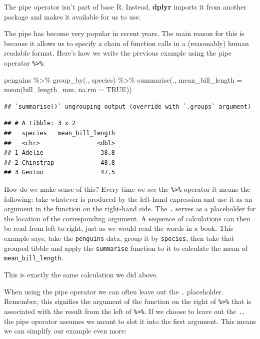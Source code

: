 \documentclass[
]{book}
\newenvironment{Shaded}{\begin{snugshade}}{\end{snugshade}}
\newcommand{\AttributeTok}[1]{\textcolor[rgb]{0.77,0.63,0.00}{#1}}
\newcommand{\ConstantTok}[1]{\textcolor[rgb]{0.00,0.00,0.00}{#1}}
\newcommand{\FunctionTok}[1]{\textcolor[rgb]{0.00,0.00,0.00}{#1}}
\newcommand{\NormalTok}[1]{#1}
\newcommand{\SpecialCharTok}[1]{\textcolor[rgb]{0.00,0.00,0.00}{#1}}
\begin{document}
The pipe operator isn't part of base R. Instead, \textbf{dplyr} imports it from another package and makes it available for us to use.

The pipe has become very popular in recent years. The main reason for this is because it allows us to specify a chain of function calls in a (reasonably) human readable format. Here's how we write the previous example using the pipe operator \texttt{\%\textgreater{}\%}:

\begin{Shaded}
\begin{Highlighting}[]
\NormalTok{penguins }\SpecialCharTok{\%\textgreater{}\%} \FunctionTok{group\_by}\NormalTok{(., species) }\SpecialCharTok{\%\textgreater{}\%} \FunctionTok{summarise}\NormalTok{(., }\AttributeTok{mean\_bill\_length =} \FunctionTok{mean}\NormalTok{(bill\_length\_mm, }\AttributeTok{na.rm =} \ConstantTok{TRUE}\NormalTok{))}
\end{Highlighting}
\end{Shaded}

\begin{verbatim}
## `summarise()` ungrouping output (override with `.groups` argument)
\end{verbatim}

\begin{verbatim}
## # A tibble: 3 x 2
##   species   mean_bill_length
##   <chr>                <dbl>
## 1 Adelie                38.8
## 2 Chinstrap             48.8
## 3 Gentoo                47.5
\end{verbatim}

How do we make sense of this? Every time we see the \texttt{\%\textgreater{}\%} operator it means the following: take whatever is produced by the left-hand expression and use it as an argument in the function on the right-hand side. The \texttt{.} serves as a placeholder for the location of the corresponding argument. A sequence of calculations can then be read from left to right, just as we would read the words in a book. This example says, take the \texttt{penguins} data, group it by \texttt{species}, then take that grouped tibble and apply the \texttt{summarise} function to it to calculate the mean of \texttt{mean\_bill\_length}.

This is exactly the same calculation we did above.

When using the pipe operator we can often leave out the \texttt{.} placeholder. Remember, this signifies the argument of the function on the right of \texttt{\%\textgreater{}\%} that is associated with the result from the left of \texttt{\%\textgreater{}\%}. If we choose to leave out the \texttt{.}, the pipe operator assumes we meant to slot it into the first argument. This means we can simplify our example even more:
\end{document}
